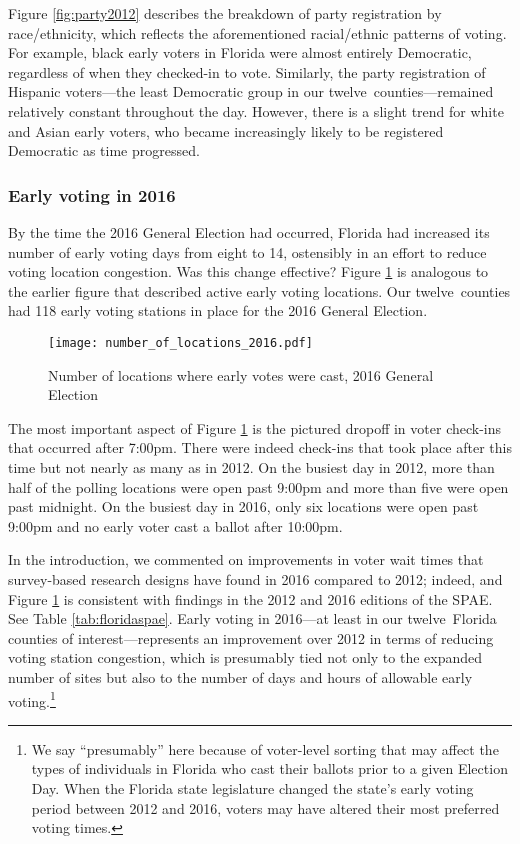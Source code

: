 \documentclass[12pt,titlepage]{article}
\newcommand{\numcounties}{twelve}
\begin{document}
Figure \ref{fig:party2012} describes the breakdown of party
registration by race/ethnicity, which reflects the aforementioned
racial/ethnic patterns of voting.  For example, black early voters in
Florida were almost entirely Democratic, regardless of when they
checked-in to vote.  Similarly, the party registration of Hispanic
voters---the least Democratic group in our \numcounties\
counties---remained relatively constant throughout the day.
However, there is a slight trend for white and Asian early voters, who
became increasingly likely to be registered Democratic as time
progressed.

\subsubsection*{Early voting in 2016}

By the time the 2016 General Election had occurred, Florida had
increased its number of early voting days from eight to 14, ostensibly
in an effort to reduce voting location congestion. Was this change
effective?  Figure \ref{fig:nrlocs2016} is analogous to the earlier
figure that described active early voting locations. Our \numcounties\
counties had 118 early voting stations in place for the 2016 General
Election.


\begin{figure}[!ht]
  \caption{Number of locations where early votes were cast, 2016 General
    Election}
  \label{fig:nrlocs2016}
  \centering
    \centering\texttt{[image: number\_of\_locations\_2016.pdf]}
\end{figure}

The most important aspect of Figure \ref{fig:nrlocs2016} is the
pictured dropoff in voter check-ins that occurred after 7:00pm. There
were indeed check-ins that took place after this time but not nearly
as many as in 2012. On the busiest day in 2012, more than half of the
polling locations were open past 9:00pm and more than five were open
past midnight. On the busiest day in 2016, only six locations were
open past 9:00pm and no early voter cast a ballot after 10:00pm.

In the introduction, we commented on improvements in voter wait times
that survey-based research designs have found in 2016 compared to
2012; indeed, and Figure \ref{fig:nrlocs2016} is consistent with
findings in the 2012 \citep{spae2012} and 2016 \citep{spae2016}
editions of the SPAE.  See Table \ref{tab:floridaspae}.  Early voting
in 2016---at least in our \numcounties\ Florida counties of
interest---represents an improvement over 2012 in terms of reducing
voting station congestion, which is presumably tied not only to the
expanded number of sites but also to the number of days and hours of
allowable early voting.\footnote{We say ``presumably'' here because of
  voter-level sorting that may affect the types of individuals in
  Florida who cast their ballots prior to a given Election Day.  When
  the Florida state legislature changed the state's early voting
  period between 2012 and 2016, voters may have altered their most
  preferred voting times.}
\end{document}
